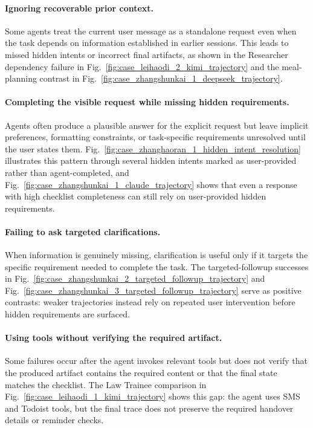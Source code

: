 \paragraph{Ignoring recoverable prior context.}
Some agents treat the current user message as a standalone request even when the task depends on information established in earlier sessions. This leads to missed hidden intents or incorrect final artifacts, as shown in the Researcher dependency failure in Fig.~\ref{fig:case_leihaodi_2_kimi_trajectory} and the meal-planning contrast in Fig.~\ref{fig:case_zhangshunkai_1_deepseek_trajectory}.

\paragraph{Completing the visible request while missing hidden requirements.}
Agents often produce a plausible answer for the explicit request but leave implicit preferences, formatting constraints, or task-specific requirements unresolved until the user states them. Fig.~\ref{fig:case_zhanghaoran_1_hidden_intent_resolution} illustrates this pattern through several hidden intents marked as user-provided rather than agent-completed, and Fig.~\ref{fig:case_zhangshunkai_1_claude_trajectory} shows that even a response with high checklist completeness can still rely on user-provided hidden requirements.

\paragraph{Failing to ask targeted clarifications.}
When information is genuinely missing, clarification is useful only if it targets the specific requirement needed to complete the task. The targeted-followup successes in Fig.~\ref{fig:case_zhangshunkai_2_targeted_followup_trajectory} and Fig.~\ref{fig:case_zhangshunkai_3_targeted_followup_trajectory} serve as positive contrasts: weaker trajectories instead rely on repeated user intervention before hidden requirements are surfaced.

\paragraph{Using tools without verifying the required artifact.}
Some failures occur after the agent invokes relevant tools but does not verify that the produced artifact contains the required content or that the final state matches the checklist. The Law Trainee comparison in Fig.~\ref{fig:case_leihaodi_1_kimi_trajectory} shows this gap: the agent uses SMS and Todoist tools, but the final trace does not preserve the required handover details or reminder checks.